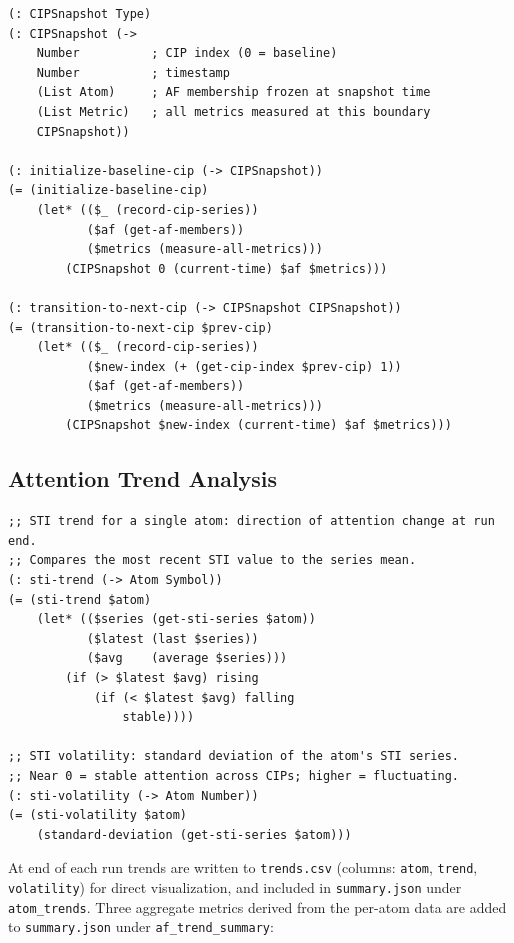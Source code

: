 \documentclass[11pt]{article}
\theoremstyle{definition}
\begin{document}
\begin{lstlisting}[style=metta, caption=CIP Tracking]
(: CIPSnapshot Type)
(: CIPSnapshot (->
    Number          ; CIP index (0 = baseline)
    Number          ; timestamp
    (List Atom)     ; AF membership frozen at snapshot time
    (List Metric)   ; all metrics measured at this boundary
    CIPSnapshot))

(: initialize-baseline-cip (-> CIPSnapshot))
(= (initialize-baseline-cip)
    (let* (($_ (record-cip-series))
           ($af (get-af-members))
           ($metrics (measure-all-metrics)))
        (CIPSnapshot 0 (current-time) $af $metrics)))

(: transition-to-next-cip (-> CIPSnapshot CIPSnapshot))
(= (transition-to-next-cip $prev-cip)
    (let* (($_ (record-cip-series))
           ($new-index (+ (get-cip-index $prev-cip) 1))
           ($af (get-af-members))
           ($metrics (measure-all-metrics)))
        (CIPSnapshot $new-index (current-time) $af $metrics)))
\end{lstlisting}

\subsection{Attention Trend Analysis}

\begin{lstlisting}[style=metta, caption=STI Trend and Volatility]
;; STI trend for a single atom: direction of attention change at run end.
;; Compares the most recent STI value to the series mean.
(: sti-trend (-> Atom Symbol))
(= (sti-trend $atom)
    (let* (($series (get-sti-series $atom))
           ($latest (last $series))
           ($avg    (average $series)))
        (if (> $latest $avg) rising
            (if (< $latest $avg) falling
                stable))))

;; STI volatility: standard deviation of the atom's STI series.
;; Near 0 = stable attention across CIPs; higher = fluctuating.
(: sti-volatility (-> Atom Number))
(= (sti-volatility $atom)
    (standard-deviation (get-sti-series $atom)))
\end{lstlisting}

At end of each run trends are written to \texttt{trends.csv}
(columns: \texttt{atom}, \texttt{trend}, \texttt{volatility}) for direct visualization,
and included in \texttt{summary.json} under \texttt{atom\_trends}.
Three aggregate metrics derived from the per-atom data are added to
\texttt{summary.json} under \texttt{af\_trend\_summary}:
\end{document}
